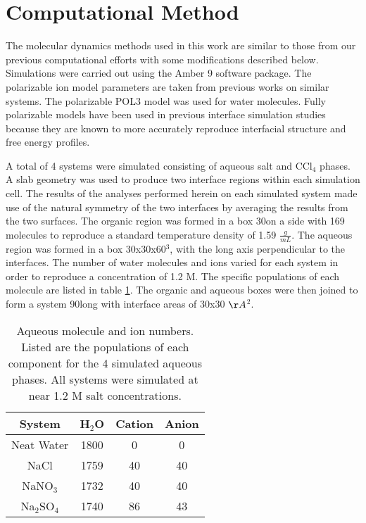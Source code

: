 \section{Computational Method}

The molecular dynamics methods used in this work are similar to those from our previous computational efforts with some modifications described below.\cite{Hore2008,Walker2006b,Hore2007} Simulations were carried out using the Amber 9 software package. The polarizable ion model parameters are taken from previous works on similar systems.\cite{Chang1997a,Dang1999,Thomas2007,Hrobarik2006,Chang1995} The polarizable POL3 model was used for water molecules.\cite{Caldwell1995} Fully polarizable models have been used in previous interface simulation studies because they are known to more accurately reproduce interfacial structure and free energy profiles.\cite{Rivera2006,Wick2007,Petersen2005b,Salvador2003,Dang1998}

A total of 4 systems were simulated consisting of aqueous salt and CCl$_4$ phases. A slab geometry was used to produce two interface regions within each simulation cell.\cite{Hore2007}  The results of the analyses performed herein on each simulated system made use of the natural symmetry of the two interfaces by averaging the results from the two surfaces. The organic region was formed in a box 30\angs on a side with 169 \ctc molecules to reproduce a standard temperature density of 1.59 $\frac{g}{mL}$. The aqueous region was formed in a box 30x30x60\angs$^3$, with the long axis perpendicular to the interfaces. The number of water molecules and ions varied for each system in order to reproduce a concentration of 1.2 M. The specific populations of each molecule are listed in table \ref{densities}. The organic and aqueous boxes were then joined to form a system 90\angs long with interface areas of 30x30 $\AA$$^2$.

\begin{table}[htdp]
	\begin{center}
	\begin{tabular}{|c||c|c|c|}
		\hline
		System & H$_2$O & Cation & Anion \\ \hline
		Neat Water & 1800 & 0 & 0 \\ 
		NaCl & 1759 & 40 & 40 \\
		NaNO$_3$ & 1732 & 40 & 40 \\
		Na$_2$SO$_4$ & 1740 & 86 & 43 \\
		\hline
	\end{tabular}
	\end{center}
	\label{densities}
	\caption{Aqueous molecule and ion numbers. Listed are the populations of each component for the 4 simulated aqueous phases. All systems were simulated at near 1.2 M salt concentrations.}
\end{table}

